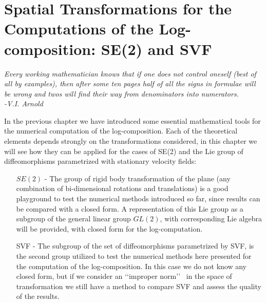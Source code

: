 \chapter{Spatial Transformations for the Computations of the Log-composition: SE(2) and SVF}\label{ch:spatial_transformations}


\begin{flushright}
	\emph{Every working mathematician knows that if one does not control oneself (best of all by examples), then after some ten pages half of all the signs in formulae will be wrong and twos will find their way from denominators into numerators. \\ -V.I. Arnold}
\end{flushright}

\noindent
In the previous chapter we have introduced some essential mathematical tools for the numerical computation of the log-composition. Each of the theoretical elements depends strongly on the transformations considered, in this chapter we will see how they can be applied for the cases of SE(2) and the Lie group of diffeomorphisms parametrized with stationary velocity fields:
\begin{enumerate}
	\item[$SE(2)$ -] The group of rigid body transformation of the plane (any combination of bi-dimensional rotations and translations) is a good playground to test the numerical methods introduced so far, since results can be compared with a closed form.
	A representation of this Lie group as a subgroup of the general linear group $GL(2)$, with corresponding Lie algebra will be provided, with closed form for the log-computation.
	\item[SVF -] The subgroup of the set of diffeomorphisms parametrized by SVF, is the second group utilized to test the numerical methods here presented for the computation of the log-composition. In this case we do not know any closed form, but if we consider an \lq\lq improper norm\rq\rq~ in the space of transformation we still have a method to compare SVF and assess the quality of the results.
\end{enumerate}



